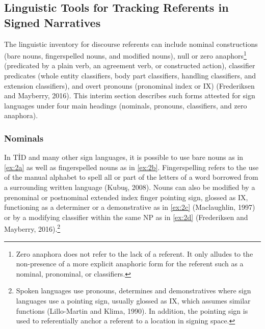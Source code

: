 \documentclass[]{elsarticle} %
\begin{document}
\hypertarget{linguistic-tools-for-tracking-referents-in-signed-narratives}{%
\subsection{Linguistic Tools for Tracking Referents in Signed
Narratives}\label{linguistic-tools-for-tracking-referents-in-signed-narratives}}

The linguistic inventory for discourse referents can include nominal
constructions (bare nouns, fingerspelled nouns, and modified nouns),
null or zero
anaphors\footnote{Zero anaphora does not refer to the lack of a referent. It only alludes to the non-presence of a more explicit anaphoric form for the referent such as a nominal, pronominal, or classifiers.}
(predicated by a plain verb, an agreement verb, or constructed action),
classifier predicates (whole entity classifiers, body part classifiers,
handling classifiers, and extension classifiers), and overt pronouns
(pronominal index or IX) (Frederiksen and Mayberry, 2016). This interim
section describes such forms attested for sign languages under four main
headings (nominals, pronouns, classifiers, and zero anaphora).

\hypertarget{nominals}{%
\subsubsection{Nominals}\label{nominals}}

In TİD and many other sign languages, it is possible to use bare nouns
as in \ref{ex:2a} as well as fingerspelled nouns as in \ref{ex:2b}.
Fingerspelling refers to the use of the manual alphabet to spell all or
part of the letters of a word borrowed from a surrounding written
language (Kubuş, 2008). Nouns can also be modified by a prenominal or
postnominal extended index finger pointing sign, glossed as IX,
functioning as a determiner or a demonstrative as in \ref{ex:2c}
(Maclaughlin, 1997) or by a modifying classifier within the same NP as
in \ref{ex:2d} (Frederiksen and Mayberry, 2016).\footnote{Spoken
  languages use pronouns, determines and demonstratives where sign
  languages use a pointing sign, usually glossed as IX, which assumes
  similar functions (Lillo-Martin and Klima, 1990). In addition, the
  pointing sign is used to referentially anchor a referent to a location
  in signing space.}
\end{document}
